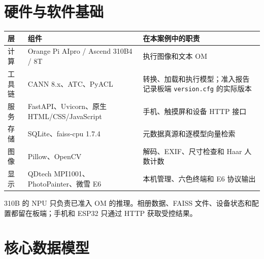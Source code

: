 \section{硬件与软件基础}\label{ux786cux4ef6ux4e0eux8f6fux4ef6ux57faux7840}

\begin{longtable}[]{@{}
  >{\raggedright\arraybackslash}p{}
  >{\raggedright\arraybackslash}p{}
  >{\raggedright\arraybackslash}p{}@{}}
\toprule\noalign{}
\begin{minipage}[b]{\linewidth}\raggedright
层
\end{minipage} & \begin{minipage}[b]{\linewidth}\raggedright
组件
\end{minipage} & \begin{minipage}[b]{\linewidth}\raggedright
在本案例中的职责
\end{minipage} \\
\midrule\noalign{}
\endhead
\bottomrule\noalign{}
\endlastfoot
计算 & Orange Pi AIpro / Ascend 310B4 / 8T & 执行图像和文本 OM \\
工具链 & CANN 8.x、ATC、PyACL & 转换、加载和执行模型；准入报告记录板端
\passthrough{\lstinline!version.cfg!} 的实际版本 \\
服务 & FastAPI、Uvicorn、原生 HTML/CSS/JavaScript & 手机、触摸屏和设备
HTTP 接口 \\
存储 & SQLite、faiss-cpu 1.7.4 & 元数据真源和逐模型向量检索 \\
图像 & Pillow、OpenCV & 解码、EXIF、尺寸检查和 Haar 人数计数 \\
显示 & QDtech MPI1001、PhotoPainter、微雪 E6 & 本机管理、六色终端和 E6
协议输出 \\
\end{longtable}

310B 的 NPU 只负责已准入 OM 的推理。相册数据、FAISS
文件、设备状态和配置都留在板端；手机和 ESP32 只通过 HTTP 获取受控结果。

\section{核心数据模型}\label{ux6838ux5fc3ux6570ux636eux6a21ux578b}

